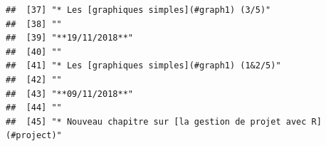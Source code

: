 \documentclass[]{book}
\begin{document}
\begin{verbatim}
##  [37] "* Les [graphiques simples](#graph1) (3/5)"                                                                                                                                                                                                                                                                  
##  [38] ""                                                                                                                                                                                                                                                                                                           
##  [39] "**19/11/2018**"                                                                                                                                                                                                                                                                                             
##  [40] ""                                                                                                                                                                                                                                                                                                           
##  [41] "* Les [graphiques simples](#graph1) (1&2/5)"                                                                                                                                                                                                                                                                
##  [42] ""                                                                                                                                                                                                                                                                                                           
##  [43] "**09/11/2018**"                                                                                                                                                                                                                                                                                             
##  [44] ""                                                                                                                                                                                                                                                                                                           
##  [45] "* Nouveau chapitre sur [la gestion de projet avec R](#project)"                                                                                                                                                                                                                                             

\end{verbatim}
\end{document}
